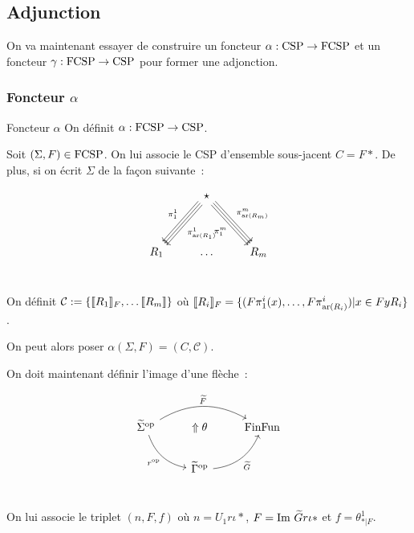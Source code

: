 \subsection{Adjunction}

On va maintenant essayer de construire un foncteur $\alpha : \text{CSP}\rightarrow\text{FCSP}$
et un foncteur $\gamma : \text{FCSP}\rightarrow\text{CSP}$ pour former une adjonction.

\subsubsection{Foncteur $\alpha$}

\begin{defi}{Foncteur $\alpha$}
    On définit $\alpha : \text{FCSP}\rightarrow\text{CSP}$.

    Soit $(\Sigma,F)\in\text{FCSP}$. On lui associe le CSP d'ensemble sous-jacent $C=F\ast$.
    De plus, si on écrit $\Sigma$ de la façon suivante~:

    \[\begin{tikzcd}
        & \star \arrow[ddl, shift right, swap, "\pi_1^1"]
                \arrow[ddl]
                \arrow[ddl, shift left, "\pi_{\text{ar}(R_1)}^1"]
                \arrow[ddr, shift right, swap, "\pi_1^m"]
                \arrow[ddr]
                \arrow[ddr, shift left, "\pi_{\text{ar}(R_m)}^m"]
                \\
        & & \\
        R_1 & \dots & R_m \\
    \end{tikzcd}\]

    On définit $\mathcal{C} := \{\llbracket {R_1} \rrbracket_F,\dots\llbracket {R_m} \rrbracket\}$ où
    $\llbracket {R_i} \rrbracket_F = \{(F\pi^i_1(x), \dots, F\pi^i_{\text{ar}(R_i)}) | x\in FyR_i\}$.

    On peut alors poser $\alpha(\Sigma,F) = (C,\mathcal{C})$.

    On doit maintenant définir l'image d'une flèche~:

    \[\begin{tikzcd}
        \tsigma^\op\arrow[dr, bend right, swap, "r^\op"]\arrow[rr, bend left, "\tf"]
            & \Uparrow\theta
            & \ffun \\
        & \tgamma^\op\arrow[ur, bend right, swap, "\tg"] \\
    \end{tikzcd}\]

    On lui associe le triplet $(n,F,f)$ où $n = U_1r\iota\ast$,
    $F = \text{Im } \widetilde{G} r\iota\ast$ et $f = \theta^1_{\ast|F}$.
\end{defi}

